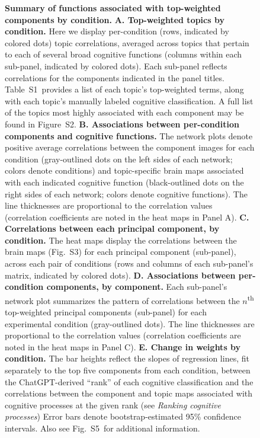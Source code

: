 \documentclass[english, 11pt]{article}
\newcommand{\topTerms}{S2}
\newcommand{\componentBrains}{S3}
\newcommand{\neurosynthFull}{S5}
\newcommand{\topics}{S1}
\begin{document}
\begin{figure}[tp]
\caption{\textbf{Summary of functions associated with top-weighted components
by condition.} \textbf{A. Top-weighted topics by condition.} Here we display
per-condition (rows, indicated by colored dots) topic correlations, averaged
across topics that pertain to each of several broad cognitive functions
(columns within each sub-panel, indicated by colored dots). Each sub-panel
reflects correlations for the components indicated in the panel titles.
Table~\topics~provides a list of each topic's top-weighted terms, along with
each topic's manually labeled cognitive classification. A full list of the
topics most highly associated with each component may be found in
Figure~\topTerms. \textbf{B. Associations between per-condition components and
cognitive functions.} The network plots denote positive average correlations
between the component images for each condition (gray-outlined dots on the left
sides of each network; colors denote conditions) and topic-specific brain maps
associated with each indicated cognitive function (black-outlined dots on the
right sides of each network; colors denote cognitive functions). The line
thicknesses are proportional to the correlation values (correlation
coefficients are noted in the heat maps in Panel A). \textbf{C. Correlations
between each principal component, by condition.} The heat maps display the
correlations between the brain maps (Fig.~\componentBrains) for each principal
component (sub-panel), across each pair of conditions (rows and columns of each
sub-panel's matrix, indicated by colored dots). \textbf{D. Associations between
per-condition components, by component.} Each sub-panel's network plot
summarizes the pattern of correlations between the $n$\textsuperscript{th}
top-weighted principal components (sub-panel) for each experimental condition
(gray-outlined dots). The line thicknesses are proportional to the correlation
values (correlation coefficients are noted in the heat maps in Panel C).
\textbf{E. Change in weights by condition.} The bar heights reflect the slopes
of regression lines, fit separately to the top five components from each
condition, between the ChatGPT-derived ``rank'' of each cognitive
classification and the correlations between the component and topic maps
associated with cognitive processes at the given rank (see \textit{Ranking
cognitive processes}) Error bars denote bootstrap-estimated 95\% confidence
intervals. Also see Fig.~\neurosynthFull~for additional information.}

\label{fig:neurosynth-summary}
\end{figure}
\end{document}

